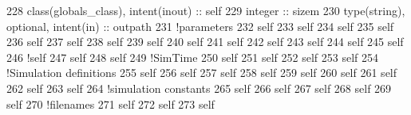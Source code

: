 \begin{DoxyCode}
228     \textcolor{keywordtype}{class}(globals\_class), \textcolor{keywordtype}{intent(inout)} :: self
229     \textcolor{keywordtype}{integer} :: sizem
230     \textcolor{keywordtype}{type}(string), \textcolor{keywordtype}{optional}, \textcolor{keywordtype}{intent(in)} :: outpath
231     \textcolor{comment}{!parameters}
232     self%
233     self%
234     self%
235     self%
236     self%
237     self%
238     self%
239     self%
240     self%
241     self%
242     self%
243     self%
244     self%
245     self%
246     \textcolor{comment}{!self%
247     self%
248     self%
249     \textcolor{comment}{!SimTime}
250     self%
251     self%
252     self%
253     self%
254     \textcolor{comment}{!Simulation definitions}
255     self%
256     self%
257     self%
258     self%
259     self%
260     self%
261     self%
262     self%
263     self%
264     \textcolor{comment}{!simulation constants}
265     self%
266     self%
267     self%
268     self%
269     self%
270     \textcolor{comment}{!filenames}
271     self%
272     self%
273     self%
}
\end{DoxyCode}
